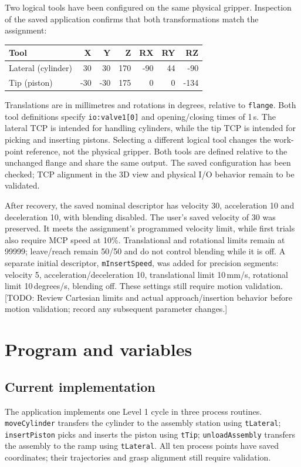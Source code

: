 \documentclass[12pt]{article}
\newcommand{\pending}[1]{\textcolor{blue!65!black}{[TODO: #1]}}
\begin{document}
Two logical tools have been configured on the same physical gripper. Inspection of the saved application confirms that both transformations match the assignment:
\begin{center}
\small
\begin{tabular}{lrrrrrr}
\toprule
Tool & X & Y & Z & RX & RY & RZ\\
\midrule
Lateral (cylinder) & 30 & 30 & 170 & -90 & 44 & -90\\
Tip (piston) & -30 & -30 & 175 & 0 & 0 & -134\\
\bottomrule
\end{tabular}
\end{center}
Translations are in millimetres and rotations in degrees, relative to \texttt{flange}. Both tool definitions specify \texttt{io:valve1[0]} and opening/closing times of 1\,s.
The lateral TCP is intended for handling cylinders, while the tip TCP is intended for picking and inserting pistons. Selecting a different logical tool changes the work-point reference, not the physical gripper. Both tools are defined relative to the unchanged flange and share the same output. The saved configuration has been checked; TCP alignment in the 3D view and physical I/O behavior remain to be validated.

After recovery, the saved nominal descriptor has velocity 30, acceleration 10 and deceleration 10, with blending disabled. The user's saved velocity of 30 was preserved. It meets the assignment's programmed velocity limit, while first trials also require MCP speed at 10\%. Translational and rotational limits remain at 99999; leave/reach remain 50/50 and do not control blending while it is off. A separate initial descriptor, \texttt{mInsertSpeed}, was added for precision segments: velocity 5, acceleration/deceleration 10, translational limit 10\,mm/s, rotational limit 10\,degrees/s, blending off. These settings still require motion validation.
\pending{Review Cartesian limits and actual approach/insertion behavior before motion validation; record any subsequent parameter changes.}

\section{Program and variables}
\subsection{Current implementation}
The application implements one Level 1 cycle in three process routines. \texttt{moveCylinder} transfers the cylinder to the assembly station using \texttt{tLateral}; \texttt{insertPiston} picks and inserts the piston using \texttt{tTip}; \texttt{unloadAssembly} transfers the assembly to the ramp using \texttt{tLateral}. All ten process points have saved coordinates; their trajectories and grasp alignment still require validation.
\end{document}
